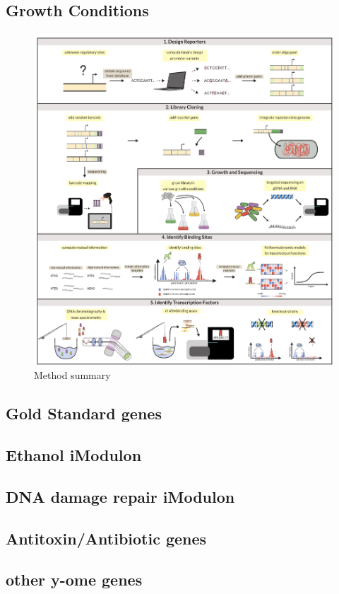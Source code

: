 \subsection{Growth Conditions}
\begin{figure}
    \centering
    \includegraphics{../figures/figure2_method_sum.pdf}
    \caption{Method summary}
    \label{fig:method_sum}
\end{figure}
\subsection{Gold Standard genes}
\subsection{Ethanol iModulon}
\subsection{DNA damage repair iModulon}
\subsection{Antitoxin/Antibiotic genes}
\subsection{other y-ome genes}

